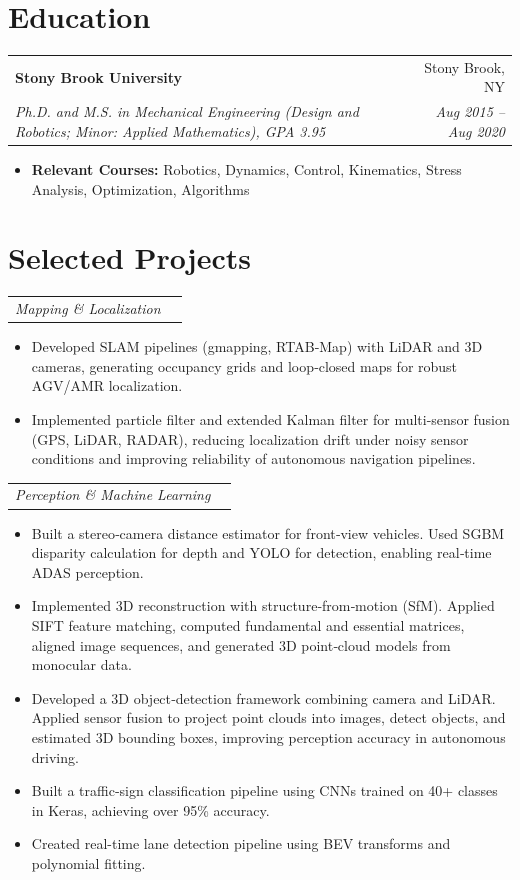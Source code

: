 \documentclass[letterpaper,10pt]{article}
\makeatletter
\newcommand{\resumeHeadingTwoLine}[4]{%
  \needspace{3\baselineskip}%
  \begin{tabular*}{\textwidth}{l@{\extracolsep{\fill}}r}
    \textbf{#1} & #2 \\
    \textit{\small #3} & \textit{\small #4}
  \end{tabular*}%
}
\newcommand{\resumeSubheading}[2]{%
  \begin{tabular*}{\textwidth}{l@{\extracolsep{\fill}}r}
    \textit{\small #1} & \textit{\small #2}
  \end{tabular*}%
}
\newcommand{\resumeItem}[1]{\item\small #1}
\makeatother
\begin{document}
\section{Education}
\resumeHeadingTwoLine
{Stony Brook University}{Stony Brook, NY}
{Ph.D. and M.S. in Mechanical Engineering (Design and Robotics; Minor: Applied Mathematics), GPA 3.95}{Aug 2015 -- Aug 2020}
\begin{itemize}
\resumeItem{\textbf{Relevant Courses:} Robotics, Dynamics, Control, Kinematics, Stress Analysis, Optimization, Algorithms}
\end{itemize}



\section{Selected Projects}

\resumeSubheading{Mapping \& Localization}{}
\begin{itemize}
\resumeItem{Developed SLAM pipelines (gmapping, RTAB‑Map) with LiDAR and 3D cameras, generating occupancy grids and loop‑closed maps for robust AGV/AMR localization.}
\resumeItem{Implemented particle filter and extended Kalman filter for multi-sensor fusion (GPS, LiDAR, RADAR), reducing localization drift under noisy sensor conditions and improving reliability of autonomous navigation pipelines.}
\end{itemize}

\resumeSubheading{Perception \& Machine Learning}{}
\begin{itemize}
\resumeItem{Built a stereo‑camera distance estimator for front‑view vehicles. Used SGBM disparity calculation for depth and YOLO for detection, enabling real‑time ADAS perception.}
\resumeItem{Implemented 3D reconstruction with structure‑from‑motion (SfM). Applied SIFT feature matching, computed fundamental and essential matrices, aligned image sequences, and generated 3D point‑cloud models from monocular data.}
\resumeItem{Developed a 3D object‑detection framework combining camera and LiDAR. Applied sensor fusion to project point clouds into images, detect objects, and estimated 3D bounding boxes, improving perception accuracy in autonomous driving.}
\resumeItem{Built a traffic‑sign classification pipeline using CNNs trained on 40+ classes in Keras, achieving over 95\% accuracy.}
\resumeItem{Created real-time lane detection pipeline using BEV transforms and polynomial fitting.}
\end{itemize}
\end{document}
